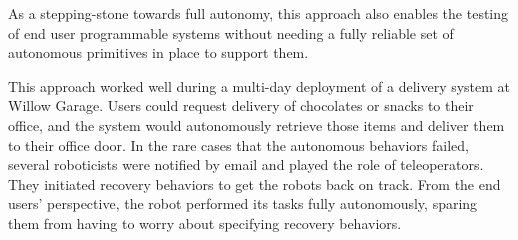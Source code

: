 \documentclass[10pt,twocolumn]{article}
\begin{document}
As a stepping-stone towards full autonomy, this approach also enables the testing of end user programmable systems without needing a fully reliable set of autonomous primitives in place to support them.

\begin{changebar}
This approach worked well during a multi-day deployment of a delivery system at Willow Garage. Users could request delivery of chocolates or snacks to their office, and the system would autonomously retrieve those items and deliver them to their office door. In the rare cases that the autonomous behaviors failed, several roboticists were notified by email and played the role of teleoperators. They initiated recovery behaviors to get the robots back on track. From the end users' perspective, the robot performed its tasks fully autonomously, sparing them from having to worry about specifying recovery behaviors.
\end{changebar}
\end{document}
